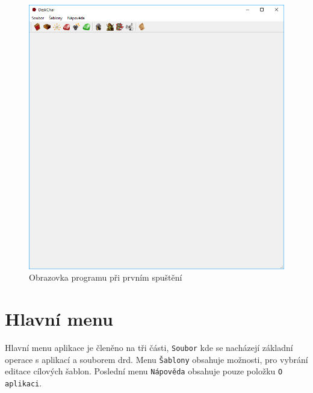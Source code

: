\documentclass[12pt,a4paper,oneside]{article}
\begin{document}
	\begin{figure}[h]
  		\centering
  		\begin{minipage}[t]{0.8\textwidth}
    		\includegraphics[width=\linewidth]{images/first_run}
    		\caption{Obrazovka programu při prvním spuštění}
    		\label{fig:first_run}
  		\end{minipage}
  		
	\end{figure}
	
	\newpage
	

	\section{Hlavní menu}
Hlavní menu aplikace je členěno na tři části, \texttt{Soubor} kde se nacházejí základní operace s aplikací a souborem drd. Menu \texttt{Šablony} obsahuje možnosti, pro vybrání editace cílových šablon. Poslední menu \texttt{Nápověda} obsahuje pouze položku \texttt{O aplikaci}. \par
			
\end{document}
